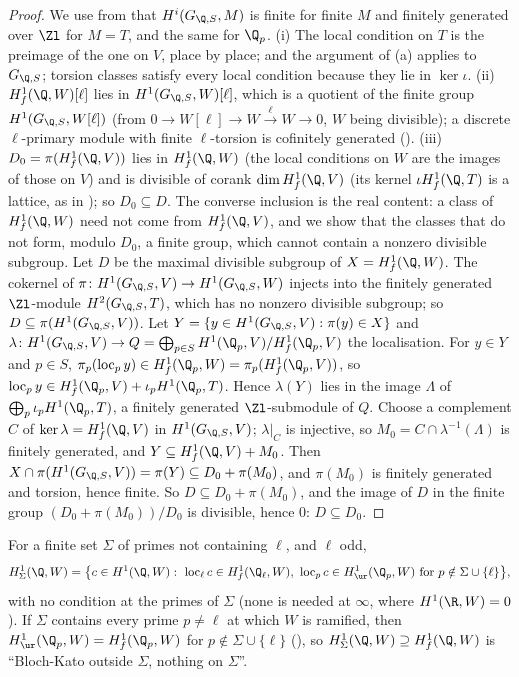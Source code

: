 \begin{proof}
We use from  that $H^i(G_{\Q,S},M)$ is finite for finite $M$ and finitely generated over $\Zl$ for $M=T$, and the same for $\Q_p$. (i) The local
condition on $T$ is the preimage of the one on $V$, place by place; and the argument of (a) applies to $G_{\Q,S}$; torsion classes
satisfy every local condition because they lie in $\ker\iota$. (ii) $H^1_f(\Q,W)[\ell]$ lies in $H^1(G_{\Q,S},W)[\ell]$, which is a quotient of the finite group
$H^1(G_{\Q,S},W[\ell])$ (from $0\to W[\ell]\to W\xrightarrow{\ell}W\to0$, $W$ being divisible); a discrete $\ell$-primary module with finite $\ell$-torsion is cofinitely generated
(). (iii) $D_0=\pi(H^1_f(\Q,V))$ lies in $H^1_f(\Q,W)$ (the local conditions on $W$ are the images of those on $V$) and is divisible of corank
$\dim H^1_f(\Q,V)$ (its kernel $\iota H^1_f(\Q,T)$ is a lattice, as in ); so $D_0\subseteq D$. The converse inclusion is the real content: a
class of $H^1_f(\Q,W)$ need not come from $H^1_f(\Q,V)$, and we show that the classes that do not form, modulo $D_0$, a finite group, which cannot contain a nonzero
divisible subgroup. Let $D$ be the maximal divisible subgroup of
$X=H^1_f(\Q,W)$. The cokernel of $\pi\colon H^1(G_{\Q,S},V)\to H^1(G_{\Q,S},W)$ injects into the finitely generated $\Zl$-module $H^2(G_{\Q,S},T)$, which has no nonzero divisible
subgroup; so $D\subseteq\pi(H^1(G_{\Q,S},V))$. Let $Y=\{y\in H^1(G_{\Q,S},V):\pi(y)\in X\}$ and $\lambda\colon H^1(G_{\Q,S},V)\to Q=\bigoplus_{p\in S}H^1(\Q_p,V)/H^1_f(\Q_p,V)$ the
localisation. For $y\in Y$ and $p\in S$, $\pi_p(\operatorname{loc}_py)\in H^1_f(\Q_p,W)=\pi_p(H^1_f(\Q_p,V))$, so $\operatorname{loc}_py\in H^1_f(\Q_p,V)+\iota_pH^1(\Q_p,T)$. Hence $\lambda(Y)$ lies in
the image $\Lambda$ of $\bigoplus_p\iota_pH^1(\Q_p,T)$, a finitely generated $\Zl$-submodule of $Q$. Choose a complement $C$ of $\ker\lambda=H^1_f(\Q,V)$ in $H^1(G_{\Q,S},V)$;
$\lambda|_C$ is injective, so $M_0=C\cap\lambda^{-1}(\Lambda)$ is finitely generated, and $Y\subseteq H^1_f(\Q,V)+M_0$. Then $X\cap\pi(H^1(G_{\Q,S},V))=\pi(Y)\subseteq D_0+\pi(M_0)$, and $\pi(M_0)$ is
finitely generated and torsion, hence finite. So $D\subseteq D_0+\pi(M_0)$, and the image of $D$ in the finite group $(D_0+\pi(M_0))/D_0$ is divisible, hence $0$: $D\subseteq D_0$.
\end{proof}

\begin{definition}\label{def:blochkato:sigma-selmer}
For a finite set $\Sigma$ of primes not containing $\ell$, and $\ell$ odd,
\[
H^1_\Sigma(\Q,W)=\bigl\{c\in H^1(\Q,W):\ \operatorname{loc}_\ell c\in H^1_f(\Q_\ell,W),\ \operatorname{loc}_pc\in H^1_{\ur}(\Q_p,W)\text{ for }p\notin\Sigma\cup\{\ell\}\bigr\},
\]
with no condition at the primes of $\Sigma$ (none is needed at $\infty$, where $H^1(\R,W)=0$). If $\Sigma$ contains every prime $p\ne\ell$ at which $W$ is ramified, then
$H^1_{\ur}(\Q_p,W)=H^1_f(\Q_p,W)$ for $p\notin\Sigma\cup\{\ell\}$ (), so $H^1_\Sigma(\Q,W)\supseteq H^1_f(\Q,W)$ is ``Bloch-Kato outside $\Sigma$, nothing on
$\Sigma$''.
\end{definition}

